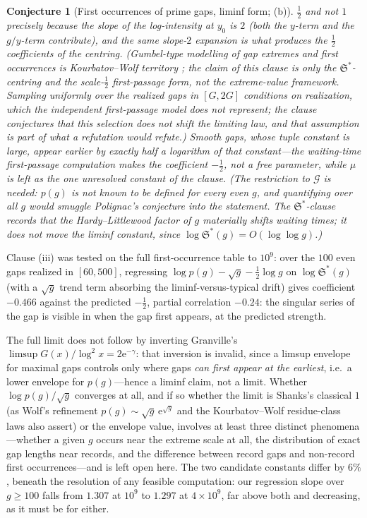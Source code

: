 \documentclass[11pt]{article}
\newtheorem{conjecture}{Conjecture}
\theoremstyle{definition}
\newcommand{\e}{\mathrm{e}}
\newcommand{\SG}{\mathfrak S}
\begin{document}
\begin{conjecture}[First occurrences of prime gaps, liminf form;
(b)]
$\tfrac12$ and not $1$ precisely because the slope of the
log-intensity at $y_0$ is $2$ (both the $y$-term and the $g/y$-term
contribute), and the same slope-$2$ expansion is what produces the
$\tfrac12$ coefficients of the centring.  (Gumbel-type modelling of gap
extremes and first occurrences is Kourbatov--Wolf territory
\cite{Kourbatov,KW2020}; the claim of this clause is only the
$\SG^{*}$-centring and the scale-$\tfrac12$ first-passage form,
not the extreme-value framework.  Sampling uniformly
over the \emph{realized}
gaps in
$[G,2G]$ conditions on realization, which the independent
first-passage model does not represent; the clause conjectures that
this selection does not shift the limiting law, and that assumption
is part of what a refutation would refute.)  Smooth
gaps, whose tuple constant is large, appear \emph{earlier} by exactly
half a logarithm of that constant---the waiting-time first-passage
computation makes the coefficient $-\tfrac12$, not a free parameter,
while $\mu$ is left as the one unresolved constant of the clause.  (The
restriction to $\mathcal G$ is needed: $p(g)$ is not known
to be defined for every even $g$, and quantifying over all $g$ would
smuggle Polignac's conjecture into the statement.  The
$\SG^{*}$-clause records that the Hardy--Littlewood factor of $g$
materially shifts waiting times; it does not move the liminf constant,
since $\log\SG^{*}(g)=O(\log\log g)$.)
\end{conjecture}

Clause (iii) was tested on the full first-occurrence table to $10^9$:
over the $100$ even gaps realized in $[60,500]$, regressing
$\log p(g)-\sqrt g-\tfrac12\log g$ on $\log\SG^{*}(g)$ (with a
$\sqrt g$ trend term absorbing the liminf-versus-typical drift) gives
coefficient $-0.466$ against the predicted $-\tfrac12$, partial
correlation $-0.24$: the singular series of the gap is visible in
when the gap first appears, at the predicted strength.

The full limit does not follow by inverting Granville's
$\limsup G(x)/\log^2x=2\e^{-\gamma}$: that inversion is invalid, since
a limsup envelope for maximal gaps controls only where gaps \emph{can
first appear at the earliest}, i.e.\ a lower envelope for
$p(g)$---hence a liminf claim, not a limit.
Whether $\log p(g)/\sqrt g$ converges at all, and if so whether the
limit is Shanks's classical $1$ \cite{Shanks} (as Wolf's refinement
$p(g)\sim\sqrt g\,\e^{\sqrt g}$ and the Kourbatov--Wolf residue-class
laws \cite{KW2020} also assert) or the envelope value, involves at
least three distinct phenomena---whether a given $g$ occurs near the
extreme scale at all, the distribution of exact gap lengths near
records, and the difference between record gaps and non-record first
occurrences---and is left open here.  The two candidate constants
differ by $6\%$, beneath the resolution of any feasible computation:
our regression slope over $g\ge100$ falls from $1.307$ at $10^9$ to
$1.297$ at $4\times10^9$, far above both and decreasing, as it must be
for either.
\end{document}
